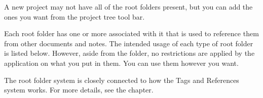 \documentclass[a4paper,11pt,english]{sphinxmanual}
\begin{document}
\sphinxAtStartPar
A new project may not have all of the root folders present, but you can add the ones you want from
the project tree tool bar.

\sphinxAtStartPar
Each root folder has one or more {\hyperref[\detokenize{int_glossary:term-Reference}]{}} {\hyperref[\detokenize{int_glossary:term-Keyword}]{}} associated with it that is used
to reference them from other documents and notes. The intended usage of each type of root folder is
listed below. However, aside from the  folder, no restrictions are applied by the
application on what you put in them. You can use them however you want.

\sphinxAtStartPar
The root folder system is closely connected to how the Tags and References system works. For more
details, see the {\hyperref[\detokenize{project_references:a-references}]{}} chapter.
\end{document}
